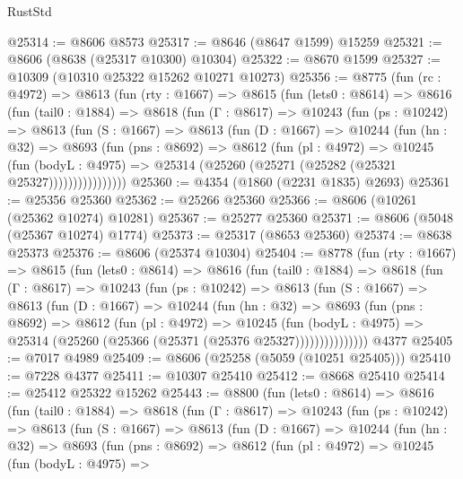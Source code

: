 \begin{lexlean}{RustStd}
\begin{coremodule}
@25314 := @8606 @8573
@25317 := @8646 (@8647 @1599) @15259
@25321 := @8606 (@8638 (@25317 @10300) @10304)
@25322 := @8670 @1599
@25327 := @10309 (@10310 @25322 @15262 @10271 @10273)
@25356 := @8775
    (fun (rc : @4972) =>
    @8613
      (fun (rty : @1667) =>
      @8615
        (fun (lets0 : @8614) =>
        @8616
          (fun (tail0 : @1884) =>
          @8618
            (fun (Γ : @8617) =>
            @10243
              (fun (ps : @10242) =>
              @8613
                (fun (S : @1667) =>
                @8613
                  (fun (D : @1667) =>
                  @10244
                    (fun (hn : @32) =>
                    @8693
                      (fun (pns : @8692) =>
                      @8612
                        (fun (pl : @4972) =>
                        @10245
                          (fun (bodyL : @4975) =>
                          @25314 (@25260 (@25271 (@25282 (@25321 @25327))))))))))))))))
@25360 := @4354 (@1860 (@2231 @1835) @2693)
@25361 := @25356 @25360
@25362 := @25266 @25360
@25366 := @8606 (@10261 (@25362 @10274) @10281)
@25367 := @25277 @25360
@25371 := @8606 (@5048 (@25367 @10274) @1774)
@25373 := @25317 (@8653 @25360)
@25374 := @8638 @25373
@25376 := @8606 (@25374 @10304)
@25404 := @8778
    (fun (rty : @1667) =>
    @8615
      (fun (lets0 : @8614) =>
      @8616
        (fun (tail0 : @1884) =>
        @8618
          (fun (Γ : @8617) =>
          @10243
            (fun (ps : @10242) =>
            @8613
              (fun (S : @1667) =>
              @8613
                (fun (D : @1667) =>
                @10244
                  (fun (hn : @32) =>
                  @8693
                    (fun (pns : @8692) =>
                    @8612
                      (fun (pl : @4972) =>
                      @10245
                        (fun (bodyL : @4975) =>
                        @25314 (@25260 (@25366 (@25371 (@25376 @25327)))))))))))))))
    @4377
@25405 := @7017 @4989
@25409 := @8606 (@25258 (@5059 (@10251 @25405)))
@25410 := @7228 @4377
@25411 := @10307 @25410
@25412 := @8668 @25410
@25414 := @25412 @25322 @15262
@25443 := @8800
    (fun (lets0 : @8614) =>
    @8616
      (fun (tail0 : @1884) =>
      @8618
        (fun (Γ : @8617) =>
        @10243
          (fun (ps : @10242) =>
          @8613
            (fun (S : @1667) =>
            @8613
              (fun (D : @1667) =>
              @10244
                (fun (hn : @32) =>
                @8693
                  (fun (pns : @8692) =>
                  @8612
                    (fun (pl : @4972) =>
                    @10245
                      (fun (bodyL : @4975) =>

\end{coremodule}
\end{lexlean}
